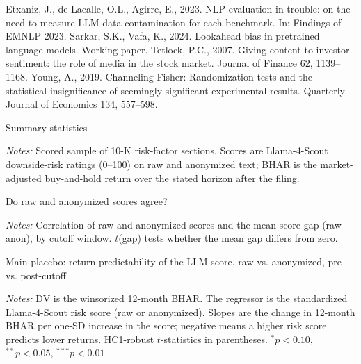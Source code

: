 \documentclass[12pt]{article}
\begin{document}
\begin{thebibliography}{99}
Etxaniz, J., de Lacalle, O.L., Agirre, E., 2023. NLP evaluation in trouble: on the need to
measure LLM data contamination for each benchmark. In: Findings of EMNLP 2023.
 Sarkar, S.K., Vafa, K., 2024. Lookahead bias in
pretrained language models. Working paper.
 Tetlock, P.C., 2007. Giving content to investor
sentiment: the role of media in the stock market. Journal of Finance 62, 1139--1168.
 Young, A., 2019. Channeling Fisher: Randomization tests and
the statistical insignificance of seemingly significant experimental results. Quarterly
Journal of Economics 134, 557--598.
\end{thebibliography}

\FloatBarrier
\newpage

\begin{table}[htbp]\centering
\begin{threeparttable}
\caption{Summary statistics}\label{tab:sumstats}\small

\begin{tablenotes}\small\item \textit{Notes:} Scored sample of 10-K risk-factor sections.
Scores are Llama-4-Scout downside-risk ratings (0--100) on raw and anonymized text; BHAR is
the market-adjusted buy-and-hold return over the stated horizon after the filing.
\end{tablenotes}
\end{threeparttable}
\end{table}

\begin{table}[htbp]\centering
\begin{threeparttable}
\caption{Do raw and anonymized scores agree?}\label{tab:agree}\small

\begin{tablenotes}\small\item \textit{Notes:} Correlation of raw and anonymized scores and
the mean score gap (raw$-$anon), by cutoff window. $t$(gap) tests whether the mean gap
differs from zero.
\end{tablenotes}
\end{threeparttable}
\end{table}

\begin{table}[htbp]\centering
\begin{threeparttable}
\caption{Main placebo: return predictability of the LLM score, raw vs. anonymized,
pre- vs. post-cutoff}\label{tab:main}\small

\begin{tablenotes}\small\item \textit{Notes:} DV is the winsorized 12-month BHAR. The
regressor is the standardized Llama-4-Scout risk score (raw or anonymized). Slopes are the
change in 12-month BHAR per one-SD increase in the score; negative means a higher risk score
predicts lower returns. HC1-robust $t$-statistics in parentheses.
$^{*}p<0.10$, $^{**}p<0.05$, $^{***}p<0.01$.
\end{tablenotes}
\end{threeparttable}
\end{table}
\end{document}
